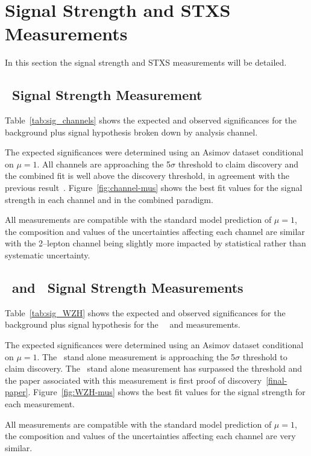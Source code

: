 \clearpage

\section{Signal Strength and STXS Measurements}
In this section the signal strength and STXS measurements will be detailed.

\subsection{\VH\ Signal Strength Measurement}
Table~\ref{tab:sig_channels} shows the expected and observed significances for
the background plus signal hypothesis broken down by analysis channel.

The expected significances were determined using an Asimov dataset conditional
on $\mu=1$. All channels are approaching the 5$\sigma$ threshold to claim
discovery and the combined fit is well above the discovery threshold, in
agreement with the previous result~\cite{vhbb-obs}. Figure~\ref{fig:channel-mus}
shows the best fit values for the signal strength in each channel and in the
combined paradigm.

All measurements are compatible with the standard model prediction of $\mu=1$,
the composition and values of the uncertainties affecting each channel are
similar with the 2--lepton channel being slightly more impacted by statistical
rather than systematic uncertainty.
%
\subsection{\WH\ and \ZH\ Signal Strength Measurements}
Table~\ref{tab:sig_WZH} shows the expected and observed significances for
the background plus signal hypothesis for the \WH\, \ZH\ and \VH measurements.

The expected significances were determined using an Asimov dataset conditional
on $\mu=1$. The \WH\ stand alone measurement is approaching the 5$\sigma$
threshold to claim discovery. The \ZH\ stand alone measurement has surpassed the
threshold and the paper associated with this measurement is first proof of
discovery~\ref{final-paper}. Figure~\ref{fig:WZH-mus} shows the best fit values
for the signal strength for each measurement.

All measurements are compatible with the standard model prediction of $\mu=1$,
the composition and values of the uncertainties affecting each channel are very
similar.
\clearpage

